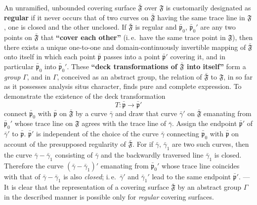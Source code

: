 \documentclass{article}
\begin{document}
An unramified, unbounded covering surface $\bar{\mathfrak{F}}$ over $\mathfrak{F}$ is customarily designated as \textbf{regular} if it never occurs that of two curves on $\bar{\mathfrak{F}}$ having the same trace line in $\mathfrak{F}$, one is closed and the other unclosed. If $\bar{\mathfrak{F}}$ is regular and $\bar{\mathfrak{p}}_0$, $\bar{\mathfrak{p}}_0'$ are any two points on $\bar{\mathfrak{F}}$ that \textbf{``cover each other''} (i.\,e.\ have the same trace point in $\mathfrak{F}$), then there exists a unique one-to-one and domain-continuously invertible mapping of $\bar{\mathfrak{F}}$ onto itself in which each point $\bar{\mathfrak{p}}$ passes into a point $\bar{\mathfrak{p}}'$ covering it, and in particular $\bar{\mathfrak{p}}_0$ into $\bar{\mathfrak{p}}_0'$. These \textbf{``deck transformations of $\bar{\mathfrak{F}}$ into itself''} form a \emph{group} $\varGamma$, and in $\varGamma$, conceived as an abstract group, the relation of $\bar{\mathfrak{F}}$ to $\mathfrak{F}$, in so far as it possesses analysis situs character, finds pure and complete expression. To demonstrate the existence of the deck transformation
\[ T\colon \bar{\mathfrak{p}} \to \bar{\mathfrak{p}}' \]
connect $\bar{\mathfrak{p}}_0$ with $\bar{\mathfrak{p}}$ on $\bar{\mathfrak{F}}$ by a curve $\bar{\gamma}$ and draw that curve $\bar{\gamma}'$ on $\bar{\mathfrak{F}}$ emanating from $\bar{\mathfrak{p}}_0'$ whose trace line on $\mathfrak{F}$ agrees with the trace line of $\bar{\gamma}$. Assign the endpoint $\bar{\mathfrak{p}}'$ of $\bar{\gamma}'$ to $\bar{\mathfrak{p}}$. $\bar{\mathfrak{p}}'$ is independent of the choice of the curve $\bar{\gamma}$ connecting $\bar{\mathfrak{p}}_0$ with $\bar{\mathfrak{p}}$ on account of the presupposed regularity of $\bar{\mathfrak{F}}$. For if $\bar{\gamma}$, $\bar{\gamma}_1$ are two such curves, then the curve $\bar{\gamma} - \bar{\gamma}_1$ consisting of $\bar{\gamma}$ and the backwardly traversed line $\bar{\gamma}_1$ is closed. Therefore the curve $(\bar{\gamma} - \bar{\gamma}_1)'$ emanating from $\bar{\mathfrak{p}}_0'$ whose trace line coincides with that of $\bar{\gamma} - \bar{\gamma}_1$ is also \emph{closed}; i.\,e.\ $\bar{\gamma}'$ and $\bar{\gamma}_1'$ lead to the same endpoint $\bar{\mathfrak{p}}'$. --- It is clear that the representation of a covering surface $\bar{\mathfrak{F}}$ by an abstract group $\varGamma$ in the described manner is possible only for \emph{regular} covering surfaces.
\end{document}
